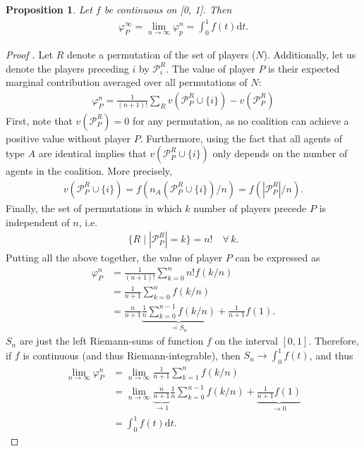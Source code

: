\documentclass[a4paper]{article}
\newtheorem{proposition}{Proposition}
\newcommand{\dt}{\mathrm{d}t}
\begin{document}
\begin{proposition}
    \label{prop:one_sided}
    Let $f$ be continuous on [0, 1]. Then
    \begin{align*}
        \varphi_P^\infty = \lim_{n \to \infty} \varphi_p^n = \int_0^1 f(t) \dt .
    \end{align*}
\end{proposition}

\begin{proof}[Proof%
    ]
    Let $R$ denote a permutation of the set of players ($N$). Additionally, let us denote the players preceding $i$ by $\mathcal{P}_i^R$. The value of player $P$ is their expected marginal contribution averaged over all permutations of $N$:
    \begin{align*}
        \varphi_P^n = \frac{1}{(n+1)!} \sum_R v(\mathcal{P}_P^R \cup \{i\}) - v(\mathcal{P}_P^R)
    \end{align*}
    First, note that $v(\mathcal{P}_P^R) = 0$ for any permutation, as no coalition can achieve a positive value without player $P$. Furthermore, using the fact that all agents of type $A$ are identical implies that $v(\mathcal{P}_P^R \cup \{i\})$ only depends on the number of agents in the coalition. More precisely, 
    \begin{align*}
        v(\mathcal{P}_P^R \cup \{i\}) = f(n_A(\mathcal{P}_P^R \cup \{i\}) / n) = f(|\mathcal{P}_P^R| / n).
    \end{align*}
    Finally, the set of permutations in which $k$ number of players precede $P$ is independent of $n$, i.e.
    \begin{align*}
        \{R \mid |\mathcal{P}_P^R| = k\} = n! \quad \forall\, k.
    \end{align*}
    Putting all the above together, the value of player $P$ can be expressed as
    \begin{align*}
        \varphi_P^n &= \frac{1}{(n+1)!} \sum_{k=0}^n n! f(k / n) \\
        &= \frac{1}{n+1} \sum_{k=0}^n f(k / n) \\
        &= \frac{n}{n+1} \underbrace{\frac{1}{n} \sum_{k=0}^{n-1} f(k / n)}_{=S_n} + \frac{1}{n+1} f(1).
    \end{align*}
    $S_n$ are just the left Riemann-sums of function $f$ on the interval $[0, 1]$. Therefore, if $f$ is continuous (and thus Riemann-integrable), then $S_n \to \int_0^1 f(t)$, and thus
    \begin{align*}
        \lim_{n \to \infty} \varphi_P^n &= \lim_{n \to \infty} \frac{1}{n+1} \sum_{k=1}^n f(k / n) \\
        &= \lim_{n \to \infty}\underbrace{\frac{n}{n+1}}_{\to 1} \frac{1}{n} \sum_{k=0}^{n-1} f(k / n) + \underbrace{\frac{1}{n+1} f(1)}_{\to 0} \\
        &= \int_0^1 f(t) \dt .
    \end{align*}
\end{proof}
\end{document}
